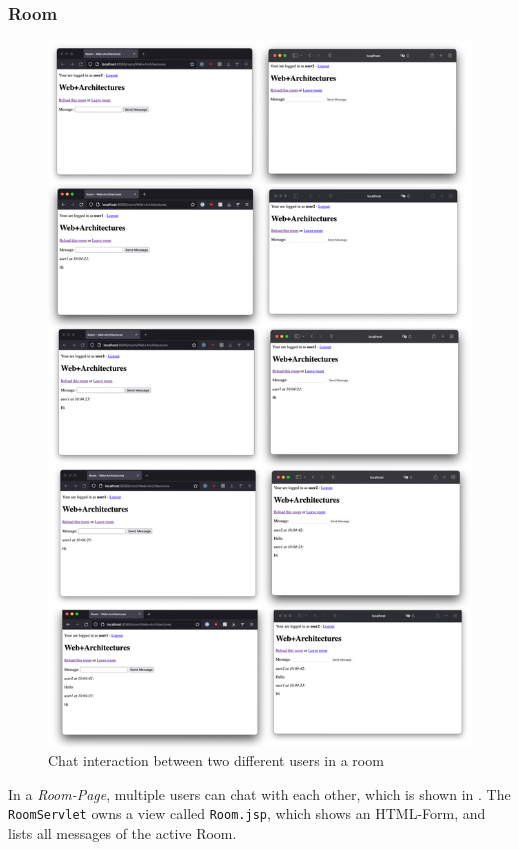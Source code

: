 \subsubsection{Room}\label{subsubsec:03_impl_servlets_room}
\begin{figure}[h]
\centering
\includegraphics[scale=0.25]{images/03_impl/room/chat_all_steps}
\caption{Chat interaction between two different users in a room}
\label{fig:03_impl_servlets_admin_chat}
\end{figure}
In a \textit{Room-Page}, multiple users can chat with each other, which is shown in .
The \texttt{RoomServlet} owns a view called \texttt{Room.jsp}, which shows an HTML-Form, and lists all messages of the active Room.

